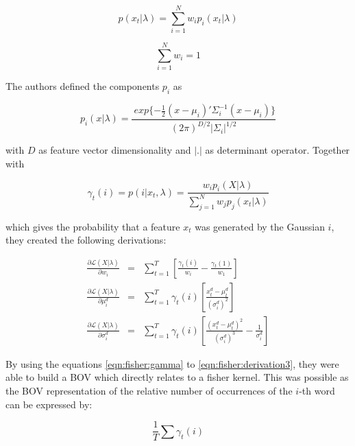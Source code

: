 \begin{equation}
p(x_t|\lambda) = \sum_{i=1}^{N} w_i p_i (x_t|\lambda)
\label{eqn:fisher_likelihood}
\end{equation}

\begin{equation}
\sum_{i=1}^{N} w_i = 1
\label{eqn:fisher_weights}
\end{equation}

The authors defined the components $p_i$ as

\begin{equation}
p_i(x|\lambda) = \frac{
	\ 	exp \{-\frac{1}{2} (x-\mu_i)' \Sigma_{i}^{-1} (x-\mu_i)\}
}{
	(2 \pi)^{D/2} | \Sigma_i |^{1/2}
}
\end{equation}

with $D$ as feature vector dimensionality and $|.|$ as determinant operator. Together with

\begin{equation}
\gamma_t(i) = p(i|x_t,\lambda) = \frac{w_i p_i(X|\lambda) }{\sum_{j=1}^{N} w_j p_j(x_t|\lambda)}
\label{eqn:fisher:gamma}
\end{equation}

which gives the probability that a feature $x_t$ was generated by the Gaussian $i$, they created the following derivations:

\begin{eqnarray}
\frac{\partial \mathcal{L} (X|\lambda)}{\partial w_i} &=& \sum_{t=1}^{T} \left[ \frac{\gamma_t(i)}{w_i} - \frac{\gamma_t(1)}{w_1} \right]
\label{eqn:fisher:derivation1}\\
\frac{\partial \mathcal{L} (X|\lambda)}{\partial \mu_i^d} &=& \sum_{t=1}^{T} \gamma_t(i) \left[ \frac{x_t^d - \mu_t^d}{(\sigma_i^d)^2} \right]
\label{eqn:fisher:derivation2}\\
\frac{\partial \mathcal{L} (X|\lambda)}{\partial \sigma_i^d} &=& \sum_{t=1}^{T} \gamma_t(i) \left[ \frac{(x_t^d - \mu_t^d)^2}{(\sigma_i^d)^3} - \frac{1}{\sigma_i^d} \right]
\label{eqn:fisher:derivation3}
\end{eqnarray}

By using the equations \ref{eqn:fisher:gamma} to \ref{eqn:fisher:derivation3}, they were able to build a \ac{BOV} which directly relates to a fisher kernel. This was possible as the \ac{BOV} representation of the relative number of occurrences of the $i$-th word can be expressed by:

\begin{equation}
\frac{1}{T} \sum \gamma_t(i)
\label{eqn:fisher:bov}
\end{equation}

